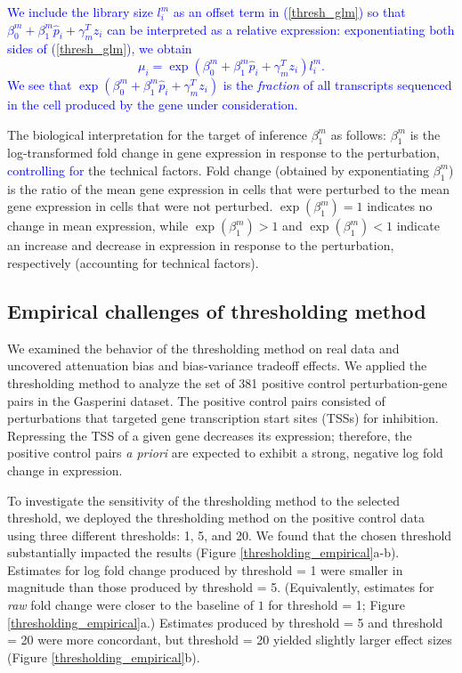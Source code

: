 \documentclass[12pt]{article}
\newcommand{\blue}[1]{\textcolor{blue}{#1}}
\begin{document}
\blue{We include the library size $l^m_i$ as an offset term in (\ref{thresh_glm}) so that $\beta^m_0 + \beta^m_1 \hat{p}_i + \gamma^T_m z_i$ can be interpreted as a relative expression: exponentiating both sides of (\ref{thresh_glm}), we obtain
$$\mu_i = \exp \left( \beta^m_0 + \beta^m_1 \hat{p}_i + \gamma^T_m z_i \right) l_i^m.$$ We see that $\exp \left( \beta^m_0 + \beta^m_1 \hat{p}_i + \gamma^T_m z_i \right)$ is the \textit{fraction} of all transcripts sequenced in the cell produced by the gene under consideration.}

The biological interpretation for the target of inference $\beta^m_1$ as follows:  $\beta^m_1$ is the log-transformed fold change in gene expression in response to the perturbation, \blue{controlling for} the technical factors. Fold change (obtained by exponentiating $\beta^m_1$) is the ratio of the mean gene expression in cells that were perturbed to the mean gene expression in cells that were not perturbed. $\exp(\beta^m_1) = 1$ indicates no change in mean expression, while $\exp(\beta^m_1) > 1$ and $\exp(\beta^m_1) < 1$ indicate an increase and decrease in expression in response to the perturbation, respectively (accounting for technical factors).

\subsection{Empirical challenges of thresholding method}\label{sec:thresholding_empirical}

We examined the behavior of the thresholding method on real data and uncovered attenuation bias and bias-variance tradeoff effects. We applied the thresholding method to analyze the set of 381 positive control perturbation-gene pairs in the Gasperini dataset. The positive control pairs consisted of perturbations that targeted gene transcription start sites (TSSs) for inhibition. Repressing the TSS of a given gene decreases its expression; therefore, the positive control pairs \textit{a priori} are expected to exhibit a strong, negative log fold change in expression.

To investigate the sensitivity of the thresholding method to the selected threshold, we deployed the thresholding method on the positive control data using three different thresholds: 1, 5, and 20. We found that the chosen threshold substantially impacted the results (Figure \ref{thresholding_empirical}a-b). Estimates for log fold change produced by threshold = 1 were smaller in magnitude than those produced by threshold = 5. (Equivalently, estimates for \textit{raw} fold change were closer to the baseline of $1$ for threshold = 1; Figure \ref{thresholding_empirical}a.) Estimates produced by threshold = 5 and threshold = 20 were more concordant, but threshold = 20 yielded slightly larger effect sizes (Figure \ref{thresholding_empirical}b).
\end{document}
